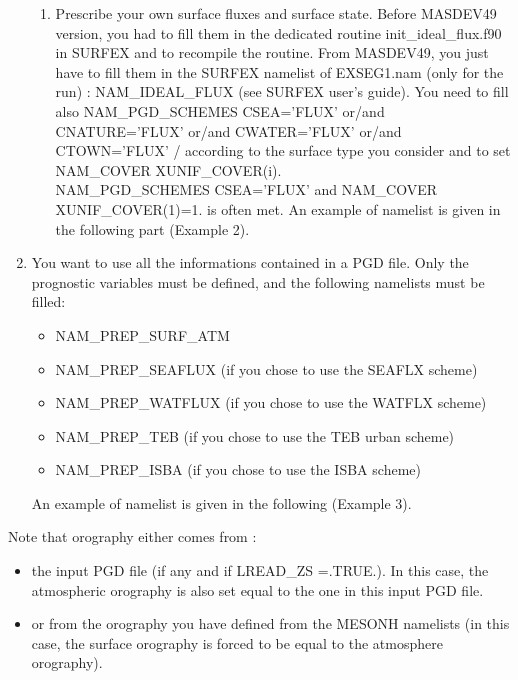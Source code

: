 \begin{enumerate}
\begin{enumerate}
\item Prescribe your own surface fluxes 
and surface state. Before MASDEV49 version, you had to fill them in the dedicated routine init\_ideal\_flux.f90
in SURFEX and to recompile the routine. From MASDEV49, you just have to fill them in the SURFEX namelist of 
EXSEG1.nam (only for the run) : NAM\_IDEAL\_FLUX (see SURFEX user's guide).
You need to fill also NAM\_PGD\_SCHEMES CSEA='FLUX' or/and
CNATURE='FLUX' or/and CWATER='FLUX' or/and CTOWN='FLUX' /
according to the surface type you consider and to set
NAM\_COVER XUNIF\_COVER(i).\\
NAM\_PGD\_SCHEMES CSEA='FLUX' and NAM\_COVER XUNIF\_COVER(1)=1. is often met.
An example of namelist is given in the following part (Example 2).
\end{enumerate}
 
\item You want to use all the informations contained in a PGD file. Only the prognostic variables must be defined, and the following namelists must be filled:

\begin{itemize}
\item NAM\_PREP\_SURF\_ATM
\item NAM\_PREP\_SEAFLUX (if you chose to use the SEAFLX scheme)
\item NAM\_PREP\_WATFLUX (if you chose to use the WATFLX scheme)
\item NAM\_PREP\_TEB (if you chose to use the TEB urban scheme)
\item NAM\_PREP\_ISBA (if you chose to use the ISBA scheme)
\end{itemize}
An example of namelist is given in the following (Example 3).

\end{enumerate}

Note that orography either comes from :
\begin{itemize}
\item the input PGD file (if any and if LREAD\_ZS =.TRUE.). In this case, the atmospheric orography is also set equal to the one in this input PGD file.
\item or from the orography you have defined from the MESONH namelists (in this case, the surface orography is forced to be equal to the atmosphere orography).
\end{itemize}

